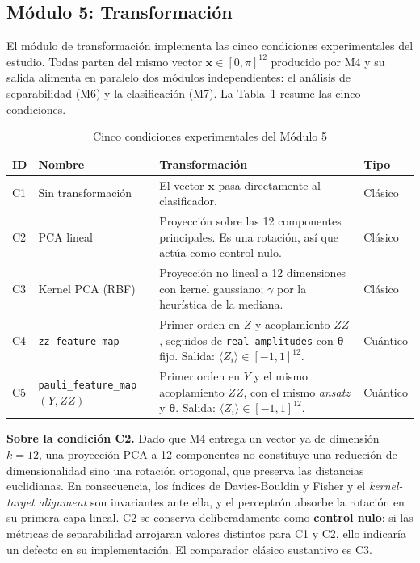 
\subsection{Módulo 5: Transformación}
\label{sec:modulo5}

El módulo de transformación implementa las cinco condiciones experimentales del estudio. Todas
parten del mismo vector $\mathbf{x} \in [0,\pi]^{12}$ producido por M4 y su salida alimenta en
paralelo dos módulos independientes: el análisis de separabilidad (M6) y la clasificación (M7).
La Tabla~\ref{tab:condiciones} resume las cinco condiciones.

\begin{table}[H]
\centering
\caption{Cinco condiciones experimentales del Módulo 5}
\label{tab:condiciones}
\renewcommand{\arraystretch}{1.3}
\begin{tabularx}{\textwidth}{@{}llXl@{}}
\toprule
\textbf{ID} & \textbf{Nombre} &
\textbf{Transformación} & \textbf{Tipo} \\
\midrule
C1 & Sin transformación & El vector $\mathbf{x}$ pasa directamente al clasificador. & Clásico \\
C2 & PCA lineal & Proyección sobre las 12 componentes principales. Es una rotación,
     así que actúa como control nulo. & Clásico \\
C3 & Kernel PCA (RBF) & Proyección no lineal a 12 dimensiones con kernel gaussiano;
     $\gamma$ por la heurística de la mediana. & Clásico \\
C4 & \texttt{zz\_feature\_map} & Primer orden en $Z$ y acoplamiento $ZZ$, seguidos de
     \texttt{real\_amplitudes} con $\boldsymbol\theta$ fijo. Salida:
     $\langle Z_i\rangle\in[-1,1]^{12}$. & Cuántico \\
C5 & \texttt{pauli\_feature\_map}$(Y, ZZ)$ & Primer orden en $Y$ y el mismo acoplamiento $ZZ$,
     con el mismo \textit{ansatz} y $\boldsymbol\theta$. Salida:
     $\langle Z_i\rangle\in[-1,1]^{12}$. & Cuántico \\
\bottomrule
\end{tabularx}
\end{table}

\textbf{Sobre la condición C2.} Dado que M4 entrega un vector ya de dimensión $k=12$, una
proyección PCA a 12 componentes no constituye una reducción de dimensionalidad sino una
rotación ortogonal, que preserva las distancias euclidianas. En consecuencia, los índices
de Davies-Bouldin y Fisher y el \textit{kernel-target alignment} son invariantes ante ella,
y el perceptrón absorbe la rotación en su primera capa lineal. C2 se conserva
deliberadamente como \textbf{control nulo}: si las métricas de separabilidad arrojaran
valores distintos para C1 y C2, ello indicaría un defecto en su implementación. El
comparador clásico sustantivo es C3.

